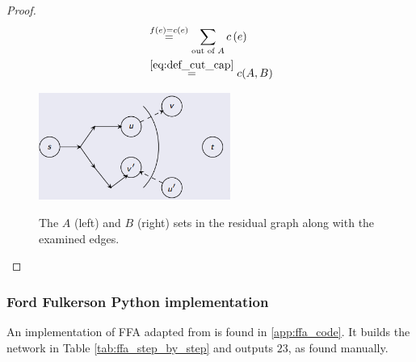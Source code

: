 \documentclass[a4paper]{article}
\begin{document}
\begin{proof}
\[\begin{split}
    &\overeq{f(e)=c(e)}\sum\limits_{\text{out of }A}{c\left( e \right)}\\
    &\overeq{\eqref{eq:def_cut_cap}} c(A,B)
\end{split}
\]
\begin{figure}[H]
	\centering %
	\label{fig:max_flow_proof_31}
	\includegraphics[height=3.5cm]{img/flows/max_flow_proof_res_st_cut1.PNG}
    \caption{The $A$ (left) and $B$ (right) sets in the residual graph along with the examined edges.}
\end{figure}
\end{proof}






\subsubsection{Ford Fulkerson Python implementation}
\marginnote{\faCogs\ \ref{app:ffa_code}\ \faCogs}
An implementation of FFA adapted from \TODO[ref] is found in \ref{app:ffa_code}. It builds the network in Table \ref{tab:ffa_step_by_step} and outputs $23$, as found manually.
\end{document}
